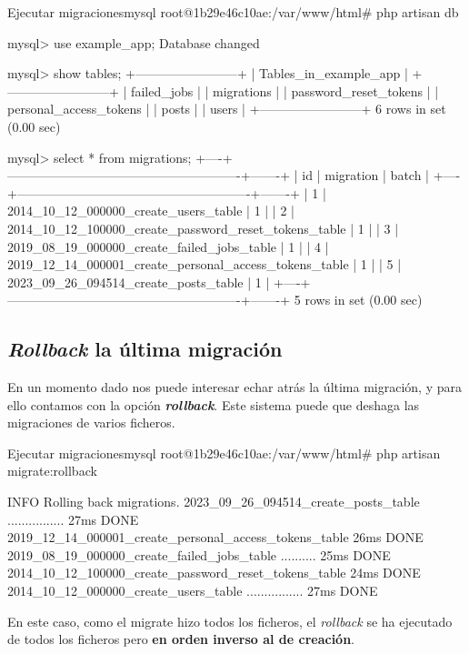 \begin{mycode}{Ejecutar migraciones}{mysql}{}
root@1b29e46c10ae:/var/www/html# php artisan db

mysql> use example_app;
Database changed

mysql> show tables;
+------------------------+
| Tables_in_example_app  |
+------------------------+
| failed_jobs            |
| migrations             |
| password_reset_tokens  |
| personal_access_tokens |
| posts                  |
| users                  |
+------------------------+
6 rows in set (0.00 sec)

mysql> select * from migrations;
+----+-------------------------------------------------------+-------+
| id | migration                                             | batch |
+----+-------------------------------------------------------+-------+
|  1 | 2014_10_12_000000_create_users_table                  |     1 |
|  2 | 2014_10_12_100000_create_password_reset_tokens_table  |     1 |
|  3 | 2019_08_19_000000_create_failed_jobs_table            |     1 |
|  4 | 2019_12_14_000001_create_personal_access_tokens_table |     1 |
|  5 | 2023_09_26_094514_create_posts_table                  |     1 |
+----+-------------------------------------------------------+-------+
5 rows in set (0.00 sec)
\end{mycode}


\subsection{\textit{Rollback} la última migración}

En un momento dado nos puede interesar echar atrás la última migración, y para ello contamos con la opción \textbf{\textit{rollback}}. Este sistema puede que deshaga las migraciones de varios ficheros.

\begin{mycode}{Ejecutar migraciones}{mysql}{}
root@1b29e46c10ae:/var/www/html# php artisan migrate:rollback

INFO  Rolling back migrations.
2023_09_26_094514_create_posts_table ................  27ms DONE
2019_12_14_000001_create_personal_access_tokens_table  26ms DONE
2019_08_19_000000_create_failed_jobs_table ..........  25ms DONE
2014_10_12_100000_create_password_reset_tokens_table   24ms DONE
2014_10_12_000000_create_users_table ................  27ms DONE
\end{mycode}

En este caso, como el migrate hizo todos los ficheros, el \textit{rollback} se ha ejecutado de todos los ficheros pero \textbf{en orden inverso al de creación}.


